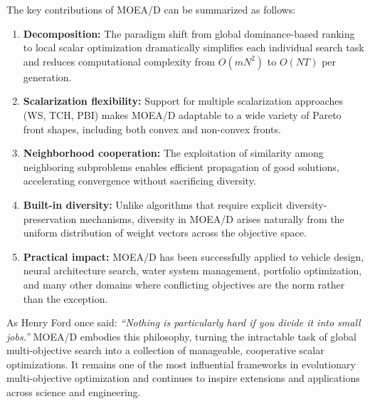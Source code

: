 \documentclass[12pt,a4paper]{article}
\begin{document}
The key contributions of MOEA/D can be summarized as follows:

\begin{enumerate}[leftmargin=1.5cm]
    \item \textbf{Decomposition:} The paradigm shift from global dominance-based ranking to local scalar optimization dramatically simplifies each individual search task and reduces computational complexity from $O(mN^2)$ to $O(NT)$ per generation.

    \item \textbf{Scalarization flexibility:} Support for multiple scalarization approaches (WS, TCH, PBI) makes MOEA/D adaptable to a wide variety of Pareto front shapes, including both convex and non-convex fronts.

    \item \textbf{Neighborhood cooperation:} The exploitation of similarity among neighboring subproblems enables efficient propagation of good solutions, accelerating convergence without sacrificing diversity.

    \item \textbf{Built-in diversity:} Unlike algorithms that require explicit diversity-preservation mechanisms, diversity in MOEA/D arises naturally from the uniform distribution of weight vectors across the objective space.

    \item \textbf{Practical impact:} MOEA/D has been successfully applied to vehicle design, neural architecture search, water system management, portfolio optimization, and many other domains where conflicting objectives are the norm rather than the exception.
\end{enumerate}

As Henry Ford once said: \textit{``Nothing is particularly hard if you divide it into small jobs.''} MOEA/D embodies this philosophy, turning the intractable task of global multi-objective search into a collection of manageable, cooperative scalar optimizations. It remains one of the most influential frameworks in evolutionary multi-objective optimization and continues to inspire extensions and applications across science and engineering.
\end{document}
